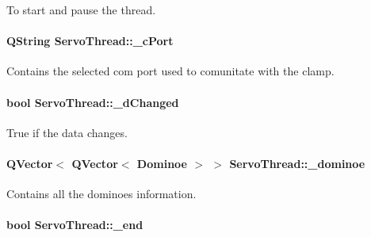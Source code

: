 To start and pause the thread. 

\hypertarget{a00009_ab52437b31a433c427a6c050f2b1cc959}{}
\paragraph[{\+\_\+c\+Port}]{\setlength{\rightskip}{0pt plus 5cm}Q\+String Servo\+Thread\+::\+\_\+c\+Port\hspace{0.3cm}{\ttfamily [private]}}\label{a00009_ab52437b31a433c427a6c050f2b1cc959}


Contains the selected com port used to comunitate with the clamp. 

\hypertarget{a00009_a2b6ccfeacbb3cc9ac5c34549b9aa3f11}{}
\paragraph[{\+\_\+d\+Changed}]{\setlength{\rightskip}{0pt plus 5cm}bool Servo\+Thread\+::\+\_\+d\+Changed\hspace{0.3cm}{\ttfamily [private]}}\label{a00009_a2b6ccfeacbb3cc9ac5c34549b9aa3f11}


True if the data changes. 

\hypertarget{a00009_ad06a87d9f22914fd2597c939a3eb61cd}{}
\paragraph[{\+\_\+dominoe}]{\setlength{\rightskip}{0pt plus 5cm}Q\+Vector$<$ Q\+Vector$<$ {\bf Dominoe} $>$ $>$ Servo\+Thread\+::\+\_\+dominoe\hspace{0.3cm}{\ttfamily [private]}}\label{a00009_ad06a87d9f22914fd2597c939a3eb61cd}


Contains all the dominoes information. 

\hypertarget{a00009_acca9896d1a2d1ef68527e6834f81c76c}{}
\paragraph[{\+\_\+end}]{\setlength{\rightskip}{0pt plus 5cm}bool Servo\+Thread\+::\+\_\+end\hspace{0.3cm}{\ttfamily [private]}}\label{a00009_acca9896d1a2d1ef68527e6834f81c76c}


